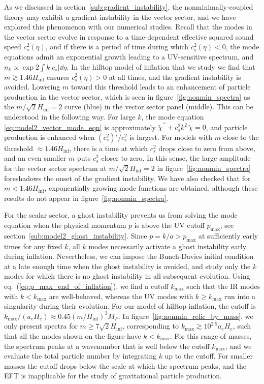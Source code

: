 \documentclass[11pt,a4paper]{article}
\newcommand{\Mpl}{M_P}
\newcommand{\fref}[1]{figure~\ref{#1}}
\newcommand{\sref}[1]{section~\ref{#1}}
\newcommand{\eref}[1]{eq.~(\ref{#1})}
\begin{document}
As we discussed in \sref{sub:gradient_instability}, the nonminimally-coupled theory may exhibit a gradient instability in the vector sector, and we have explored this phenomenon with our numerical studies.  Recall that the modes in the vector sector evolve in response to a time-dependent effective squared sound speed $c_s^2(\eta)$, and if there is a period of time during which $c_s^2(\eta) < 0$, the mode equations admit an exponential growth leading to a UV-sensitive spectrum, and $n_k \propto \exp{2 \int k |c_s| \dd{\eta}}$.  In the hilltop model of inflation that we study we find that $m \gtrsim 1.46 H_\mathrm{inf}$ ensures $c_s^2(\eta) > 0$ at all times, and the gradient instability is avoided.  Lowering $m$ toward this threshold leads to an enhancement of particle production in the vector sector, which is seen in \fref{fig:nonmin_spectra} as the $m/\sqrt{2} H_\mathrm{inf} = 2$ curve (blue) in the vector sector panel (middle).  This can be understood in the following way.  For large $k$, the mode equation \eqref{eq:model2_vector_mode_eqn} is approximately $\tilde{\chi}^{\prime\prime} + c_s^2 k^2 \, \tilde{\chi} = 0$, and particle production is enhanced when $(c_s^2)' / c_s^2$ is largest. For models with $m$ close to the threshold $\approx 1.46 H_\mathrm{inf}$, there is a time at which $c_s^2$ drops close to zero from above, and an even smaller $m$ puts $c_s^2$ closer to zero.  In this sense, the large amplitude for the vector sector spectrum at $m / \sqrt{2} H_\mathrm{inf} = 2$ in \fref{fig:nonmin_spectra} foreshadows the onset of the gradient instability.  We have also checked that for $m < 1.46 H_\mathrm{inf}$, exponentially growing mode functions are obtained, although these results do not appear in \fref{fig:nonmin_spectra}.  

For the scalar sector, a ghost instability prevents us from solving the mode equation when the physical momentum $p$ is above the UV cutoff $p_\mathrm{max}$; see \sref{sub:model2_ghost_instability}.  Since $p = k/a > p_\mathrm{max}$ at sufficiently early times for any fixed $k$, all $k$ modes necessarily activate a ghost instability early during inflation.  Nevertheless, we can impose the Bunch-Davies initial condition at a late enough time when the ghost instability is avoided, and study only the $k$ modes for which there is no ghost instability in all subsequent evolution.  
Using \eref{eq:p_max_end_of_inflation}, we find a cutoff $k_\mathrm{max}$ such that the IR modes with $k < k_\mathrm{max}$ are well-behaved, whereas the UV modes with $k \geq k_\mathrm{max}$ run into a singularity during their evolution.
For our model of hilltop inflation, the cutoff is $k_\mathrm{max} / ( a_e H_e ) \approx 0.45 (m/H_\mathrm{inf})^3 \Mpl$.  In \fref{fig:nonmin_relic_by_mass}, we only present spectra for $m \geq 7 \sqrt{2} H_\mathrm{inf}$, corresponding to $k_\mathrm{max} \gtrsim 10^{2.5} a_e H_e$, such that all the modes shown on the figure have $k < k_\mathrm{max}$.   For this range of masses, the spectrum peaks at a wavenumber that is well below the cutoff $k_\mathrm{max}$, and we evaluate the total particle number by integrating $k$ up to the cutoff.  For smaller masses the cutoff drops below the scale at which the spectrum peaks, and the EFT is inapplicable for the study of gravitational particle production.  
\end{document}
